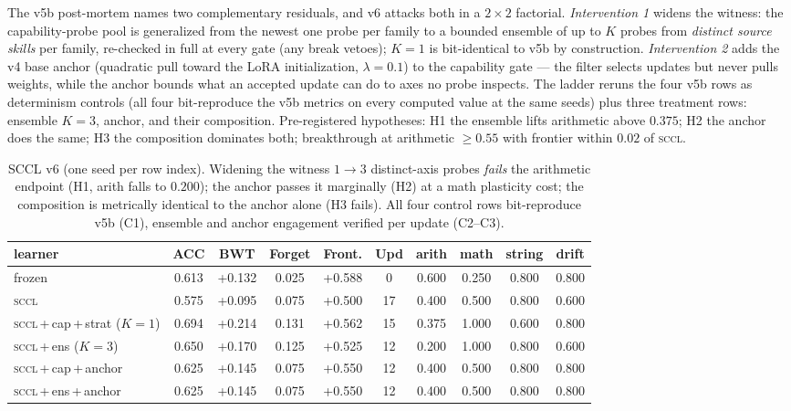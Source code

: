 \documentclass[10pt,conference]{IEEEtran}
\begin{document}
The v5b post-mortem names two complementary residuals, and v6 attacks both in a $2\times2$ factorial. \emph{Intervention 1} widens the witness: the capability-probe pool is generalized from the newest one probe per family to a bounded ensemble of up to $K$ probes from \emph{distinct source skills} per family, re-checked in full at every gate (any break vetoes); $K=1$ is bit-identical to v5b by construction. \emph{Intervention 2} adds the v4 base anchor (quadratic pull toward the LoRA initialization, $\lambda=0.1$) to the capability gate --- the filter selects updates but never pulls weights, while the anchor bounds what an accepted update can do to axes no probe inspects. The ladder reruns the four v5b rows as determinism controls (all four bit-reproduce the v5b metrics on every computed value at the same seeds) plus three treatment rows: ensemble $K=3$, anchor, and their composition. Pre-registered hypotheses: H1 the ensemble lifts arithmetic above $0.375$; H2 the anchor does the same; H3 the composition dominates both; breakthrough at arithmetic $\geq 0.55$ with frontier within $0.02$ of \textsc{sccl}.

\begin{table}[t]
\centering
\small
\caption{SCCL v6 (one seed per row index). Widening the witness $1\to3$ distinct-axis probes \emph{fails} the arithmetic endpoint (H1, arith falls to $0.200$); the anchor passes it marginally (H2) at a math plasticity cost; the composition is metrically identical to the anchor alone (H3 fails). All four control rows bit-reproduce v5b (C1), ensemble and anchor engagement verified per update (C2--C3).}
\label{tab:v6}
\begin{tabular}{lccccccccc}
\toprule
learner & ACC & BWT & Forget & Front. & Upd & arith & math & string & drift \\
\midrule
frozen                     & 0.613 & +0.132 & 0.025 & +0.588 & 0  & 0.600 & 0.250 & 0.800 & 0.800 \\
\textsc{sccl}              & 0.575 & +0.095 & 0.075 & +0.500 & 17 & 0.400 & 0.500 & 0.800 & 0.600 \\
\textsc{sccl}\,+\,cap\,+\,strat ($K{=}1$)        & 0.694 & +0.214 & 0.131 & +0.562 & 15 & 0.375 & 1.000 & 0.600 & 0.800 \\
\textsc{sccl}\,+\,ens ($K{=}3$)                  & 0.650 & +0.170 & 0.125 & +0.525 & 12 & 0.200 & 1.000 & 0.800 & 0.600 \\
\textsc{sccl}\,+\,cap\,+\,anchor                 & 0.625 & +0.145 & 0.075 & +0.550 & 12 & 0.400 & 0.500 & 0.800 & 0.800 \\
\textsc{sccl}\,+\,ens\,+\,anchor                 & 0.625 & +0.145 & 0.075 & +0.550 & 12 & 0.400 & 0.500 & 0.800 & 0.800 \\
\bottomrule
\end{tabular}
\end{table}
\end{document}
